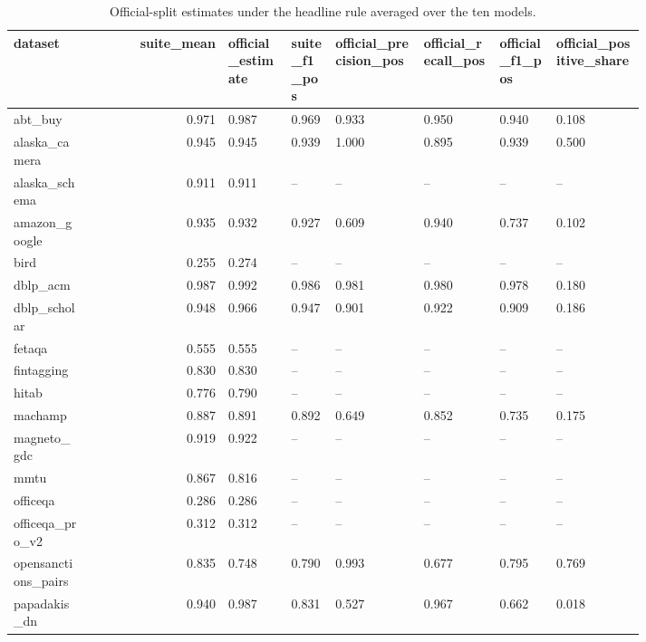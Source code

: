 \begin{table}[htbp]
\centering\tiny
\caption{Official-split estimates under the headline rule averaged over the ten models.}
\label{tab:official_split_by_dataset}
\setlength{\tabcolsep}{3pt}
\begin{tabular}{p{0.121\linewidth}rp{0.108\linewidth}p{0.076\linewidth}p{0.140\linewidth}p{0.121\linewidth}p{0.095\linewidth}p{0.146\linewidth}}
\toprule
dataset & suite\_\allowbreak{}mean & official\_\allowbreak{}estimate & suite\_\allowbreak{}f1\_\allowbreak{}pos & official\_\allowbreak{}precision\_\allowbreak{}pos & official\_\allowbreak{}recall\_\allowbreak{}pos & official\_\allowbreak{}f1\_\allowbreak{}pos & official\_\allowbreak{}positive\_\allowbreak{}share \\
\midrule
abt\_\allowbreak{}buy & 0.971 & 0.987 & 0.969 & 0.933 & 0.950 & 0.940 & 0.108 \\
alaska\_\allowbreak{}camera & 0.945 & 0.945 & 0.939 & 1.000 & 0.895 & 0.939 & 0.500 \\
alaska\_\allowbreak{}schema & 0.911 & 0.911 & -- & -- & -- & -- & -- \\
amazon\_\allowbreak{}google & 0.935 & 0.932 & 0.927 & 0.609 & 0.940 & 0.737 & 0.102 \\
bird & 0.255 & 0.274 & -- & -- & -- & -- & -- \\
dblp\_\allowbreak{}acm & 0.987 & 0.992 & 0.986 & 0.981 & 0.980 & 0.978 & 0.180 \\
dblp\_\allowbreak{}scholar & 0.948 & 0.966 & 0.947 & 0.901 & 0.922 & 0.909 & 0.186 \\
fetaqa & 0.555 & 0.555 & -- & -- & -- & -- & -- \\
fintagging & 0.830 & 0.830 & -- & -- & -- & -- & -- \\
hitab & 0.776 & 0.790 & -- & -- & -- & -- & -- \\
machamp & 0.887 & 0.891 & 0.892 & 0.649 & 0.852 & 0.735 & 0.175 \\
magneto\_\allowbreak{}gdc & 0.919 & 0.922 & -- & -- & -- & -- & -- \\
mmtu & 0.867 & 0.816 & -- & -- & -- & -- & -- \\
officeqa & 0.286 & 0.286 & -- & -- & -- & -- & -- \\
officeqa\_\allowbreak{}pro\_\allowbreak{}v2 & 0.312 & 0.312 & -- & -- & -- & -- & -- \\
opensanctions\_\allowbreak{}pairs & 0.835 & 0.748 & 0.790 & 0.993 & 0.677 & 0.795 & 0.769 \\
papadakis\_\allowbreak{}dn & 0.940 & 0.987 & 0.831 & 0.527 & 0.967 & 0.662 & 0.018 \\

\end{tabular}
\end{table}
